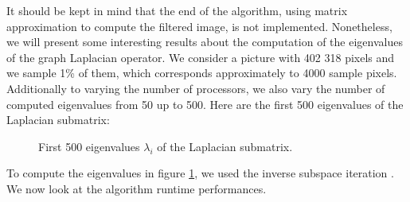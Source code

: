It should be kept in mind that the end of the algorithm, using matrix approximation to compute the filtered image, is not implemented.
Nonetheless, we will present some interesting results about the computation of the eigenvalues of the graph Laplacian operator.
We consider a picture with 402 318 pixels and we sample 1\% of them, which corresponds approximately to 4000 sample pixels.
Additionally to varying the number of processors, we also vary the number of computed eigenvalues from 50 up to 500.
Here are the first 500 eigenvalues of the Laplacian submatrix:

\begin{figure}[H]
  \centering
  
  \caption{First 500 eigenvalues \(\lambda_i\) of the Laplacian submatrix.}
  \label{fig:500_eigenvalues}
\end{figure}

To compute the eigenvalues in figure \ref{fig:500_eigenvalues}, we used the inverse subspace iteration \cite{el_khoury_acceleration_2014}.
We now look at the algorithm runtime performances.
